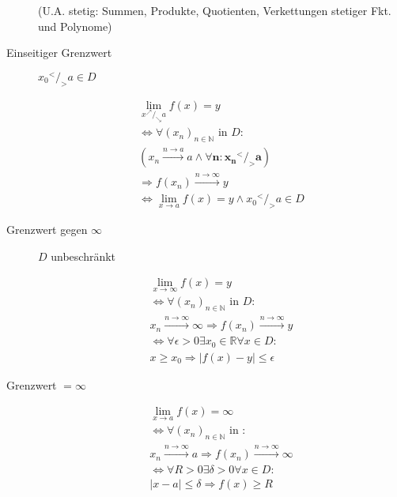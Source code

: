 \begin{description}
        (U.A. stetig: Summen, Produkte, Quotienten, Verkettungen stetiger Fkt. und Polynome)

  \item [Einseitiger Grenzwert]
        $x_0 {}^{<}/_{>} a \in D$

        \begin{gather*}
          \lim_{x {}^{\nearrow}/_{\searrow} a} f(x) = y \\
          \Leftrightarrow \forall (x_n)_{n \in \mathbb{N}} \text{ in } D: \\ (x_n \xrightarrow{n \rightarrow a} a \land  \mathbf{\forall n: x_n {}^{<}/_{>} a}) \\ \Rightarrow f(x_n) \xrightarrow{n \rightarrow \infty} y \\
          \Leftrightarrow \lim_{x \rightarrow a} f(x) = y \land x_0 {}^{<}/_{>} a \in D
        \end{gather*}

  \item [Grenzwert gegen $\infty$]
        $D$ unbeschränkt

        \begin{gather*}
          \lim_{x \rightarrow \infty} f(x) = y \\
          \Leftrightarrow \forall (x_n)_{n \in \mathbb{N}} \text{ in } D: \\
          x_n \xrightarrow{n \rightarrow \infty} \infty \Rightarrow f(x_n) \xrightarrow{n \rightarrow \infty} y \\
          \Leftrightarrow \forall \epsilon > 0 \exists x_0 \in \mathbb{R} \forall x \in D: \\
          x \geq x_0 \Rightarrow |f(x) - y| \leq \epsilon
        \end{gather*}

  \item [Grenzwert $= \infty$]

        \begin{gather*}
          \lim_{x \rightarrow a} f(x) = \infty \\
          \Leftrightarrow \forall (x_n)_{n \in \mathbb{N}} \text{ in }: \\
          x_n \xrightarrow{n \rightarrow \infty} a \Rightarrow f(x_n) \xrightarrow{n \rightarrow \infty} \infty \\
          \Leftrightarrow \forall R > 0 \exists \delta > 0 \forall x \in D: \\
          |x - a| \leq \delta \Rightarrow f(x) \geq R
        \end{gather*}
\end{description}

